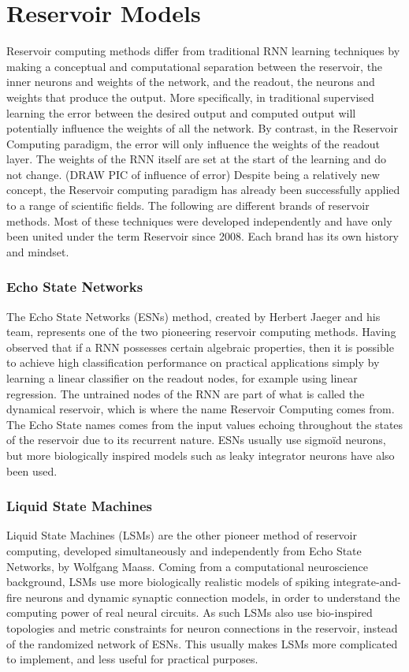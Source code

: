 \documentclass[12pt,oneside]{CUNY_CS_PhD}
\begin{document}
\section{Reservoir Models}
Reservoir computing methods differ from traditional RNN learning techniques by making a conceptual  and computational separation between the reservoir, the inner neurons and weights of the network, and the readout, the neurons and weights that produce the output. More specifically, in traditional supervised learning the error between the desired output and computed output will potentially influence the weights of all the network. By contrast, in the Reservoir Computing paradigm, the error will only influence the weights of the readout layer. The weights of the RNN itself are set at the start of the learning and do not change.
(DRAW PIC of influence of error)
Despite being a relatively new concept, the Reservoir computing paradigm has already been successfully applied to a range of scientific fields. The following are different brands of reservoir methods. Most of these techniques were developed independently and have only been united under the term Reservoir since 2008. Each brand has its own history and mindset.

\subsubsection{Echo State Networks}
The Echo State Networks (ESNs) method, created by Herbert Jaeger and his team, represents one of the two pioneering reservoir computing methods. Having observed that if a RNN possesses certain algebraic properties, then it is possible to achieve high classification performance on practical applications simply by learning a linear classifier on the readout nodes, for example using linear regression. The untrained nodes of the RNN are part of what is called the dynamical reservoir, which is where the name Reservoir Computing comes from. The Echo State names comes from the input values echoing throughout the states of the reservoir due to its recurrent nature. ESNs usually use sigmoïd neurons, but more biologically inspired models such as leaky integrator neurons have also been used.

\subsubsection{Liquid State Machines}
Liquid State Machines (LSMs) are the other pioneer method of reservoir computing, developed simultaneously and independently from Echo State Networks, by Wolfgang Maass. Coming from a computational neuroscience background, LSMs use more biologically realistic models of spiking integrate-and-fire neurons and dynamic synaptic connection models, in order to understand the computing power of real neural circuits. As such LSMs also use bio-inspired topologies and metric constraints for neuron connections in the reservoir, instead of the randomized network of ESNs. This usually makes LSMs more complicated to implement, and less useful for practical purposes.
\end{document}
